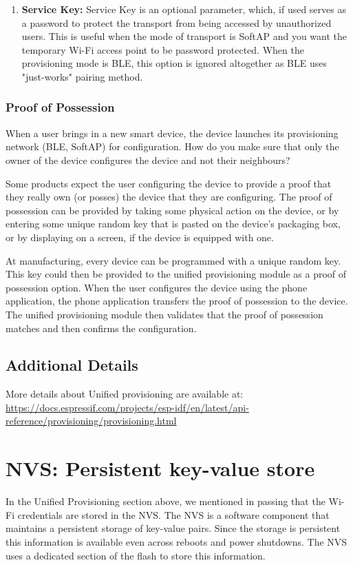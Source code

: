 \documentclass[main.tex]{subfiles}
\begin{document}
\begin{enumerate}
    \item \textbf{Service Key:} Service Key is an optional parameter, which, if used serves as a password to protect the transport from being accessed by unauthorized users. This is useful when the mode of transport is SoftAP and you want the temporary Wi-Fi access point to be password protected. When the provisioning mode is BLE, this option is ignored altogether as BLE uses "just-works" pairing method.
\end{enumerate}

\subsubsection{Proof of Possession}

When a user brings in a new smart device, the device launches its provisioning network (BLE, SoftAP) for configuration.  How do you make sure that only the owner of the device configures the device and not their neighbours?

Some products expect the user configuring the device to provide a proof that they really own (or posses) the device that they are configuring. The proof of possession can be provided by taking some physical action on the device, or by entering some unique random key that is pasted on the device's packaging box, or by displaying on a screen, if the device is equipped with one.

At manufacturing, every device can be programmed with a unique random key. This key could then be provided to the unified provisioning module as a proof of possession option. When the user configures the device using the phone application, the phone application transfers the proof of possession to the device. The unified provisioning module then validates that the proof of possession matches and then confirms the configuration.

\subsection{Additional Details}

More details about Unified provisioning are available at: \url{https://docs.espressif.com/projects/esp-idf/en/latest/api-reference/provisioning/provisioning.html}

\section{NVS: Persistent key-value store}\label{sec:nvs_info}
In the Unified Provisioning section above, we mentioned in passing that the Wi-Fi credentials are stored in the NVS. The NVS is a software component that maintains a persistent storage of key-value pairs. Since the storage is persistent this information is available even across reboots and power shutdowns. The NVS uses a dedicated section of the flash to store this information.
\end{document}
